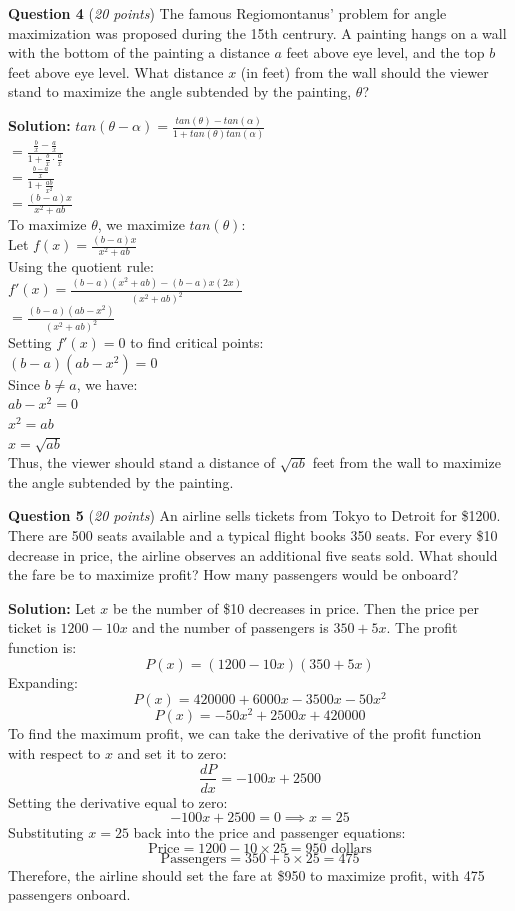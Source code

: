 \documentclass{article}
\begin{document}
\vspace{1cm}
\textbf{Question 4} (\textit{20 points}) The famous Regiomontanus' problem for angle maximization was proposed during the 15th centrury.  A painting hangs on a wall with the bottom of the painting a distance $a$ feet above eye level, and the top $b$ feet above eye level. What distance $x$ (in feet) from the wall should the viewer stand to maximize the angle subtended by the painting, $\theta$?

\textbf{Solution:}
$tan(\theta - \alpha) = \frac{tan(\theta) - tan(\alpha)}{1 + tan(\theta)tan(\alpha)}$ \\
$ = \frac{\frac{b}{x} - \frac{a}{x}}{1 + \frac{b}{x} \cdot \frac{a}{x}}$ \\
$ = \frac{\frac{b-a}{x}}{1 + \frac{ab}{x^2}}$ \\
$ = \frac{(b-a)x}{x^2 + ab}$ \\
To maximize $\theta$, we maximize $tan(\theta)$: \\
Let $f(x) = \frac{(b-a)x}{x^2 + ab}$ \\
Using the quotient rule: \\
$f'(x) = \frac{(b-a)(x^2 + ab) - (b-a)x(2x)}{(x^2 + ab)^2}$ \\
$= \frac{(b-a)(ab - x^2)}{(x^2 + ab)^2}$ \\
Setting $f'(x) = 0$ to find critical points: \\
$(b-a)(ab - x^2) = 0$ \\
Since $b \neq a$, we have: \\
$ab - x^2 = 0$ \\
$x^2 = ab$ \\
$x = \sqrt{ab}$ \\
Thus, the viewer should stand a distance of $\sqrt{ab}$ feet from the wall to maximize the angle subtended by the painting.

\vspace{1cm}
\textbf{Question 5} (\textit{20 points}) An airline sells tickets from Tokyo to Detroit for \$1200.  There are 500 seats available and a typical flight books 350 seats.  For every \$10 decrease in price, the airline observes an additional five seats sold.  What should the fare be to maximize profit? How many passengers would be onboard?

\textbf{Solution:}
Let $x$ be the number of \$10 decreases in price.  Then the price per ticket is $1200 - 10x$ and the number of passengers is $350 + 5x$.  The profit function is:
\[P(x) = (1200 - 10x)(350 + 5x) \]
Expanding:
\[P(x) = 420000 + 6000x - 3500x - 50x^2 \]
\[P(x) = -50x^2 + 2500x + 420000 \]
To find the maximum profit, we can take the derivative of the profit function with respect to \( x \) and set it to zero:
\[ \frac{dP}{dx} = -100x + 2500 \]
Setting the derivative equal to zero:
\[ -100x + 2500 = 0 \implies x = 25 \]
Substituting \( x = 25 \) back into the price and passenger equations:
\[ \text{Price} = 1200 - 10 \times 25 = 950 \text{ dollars} \]
\[ \text{Passengers} = 350 + 5 \times 25 = 475 \]
Therefore, the airline should set the fare at \$950 to maximize profit, with 475 passengers onboard.
\end{document}
